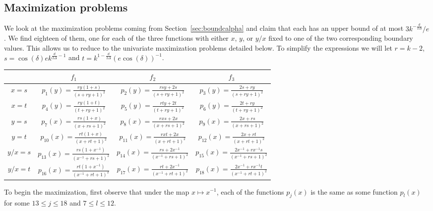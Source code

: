 \documentclass[10pt,a4paper]{article}
\theoremstyle{definition}
\begin{document}
\subsection{Maximization problems}
\label{app:zfr}
We look at the maximization problems coming from Section~\ref{sec:boundcalpha} and claim that each has an upper bound of at most $3 k^{-\frac{d}{2\Delta}}/e$.
We find eighteen of them, one for each of the three functions with either $x$, $y$, or $y/x$ fixed to one of the two corresponding boundary values.
This allows us to reduce to the univariate maximization problems detailed below.
To simplify the expressions we will let $r=k-2 $, $s = \cos(\delta)e k^{\frac{d}{2\Delta}-1}$ and $t=k^{1-\frac{d}{2\Delta}}(e\cos(\delta))^{-1}$.
%
\begin{center}
\begin{tabular}{ |c|c|c|c| }
\hline
& $f_1$ & $f_2$ & $f_3$ \\ \hline
  $x = s$ 
  & $p_1(y) =\frac{ry(1+s)}{(s+ry+1)^2}$
  & $p_2(y) = \frac{rsy+2s}{(s+ry+1)^2}$
  & $p_3(y) = \frac{2s+ry}{(s+ry+1)^2}$
  \\ \hline
  
  $x = t$ 
  & $p_4(y) = \frac{ry(1+t)}{(t+ry+1)^2}$ 
  & $p_5(y) = \frac{rty+2t}{(t+ry+1)^2}$
  & $p_6(y) = \frac{2t+ry}{(t+ry+1)^2}$
  \\ \hline
  
  $y = s$ 
  & $p_7(x) = \frac{rs(1+x)}{(x+rs+1)^2}$ 
  & $p_8(x) = \frac{rxs+2x}{(x+rs+1)^2}$
  & $p_9(x) = \frac{2x+rs}{(x+rs+1)^2}$
  \\ \hline
  
  $y = t$ 
  & $p_{10}(x) = \frac{rt(1+x)}{(x+rt+1)^2}$ 
  & $p_{11}(x) = \frac{rxt+2x}{(x+rt+1)^2}$
  & $p_{12}(x) = \frac{2x+rt}{(x+rt+1)^2}$
  \\ \hline
  
  $y/x = s$ 
  & $p_{13}(x) = \frac{rs(1+x^{-1})}{(x^{-1}+rs+1)^2}$ 
  & $p_{14}(x) = \frac{rs+2x^{-1}}{(x^{-1}+rs+1)^2}$ 
  & $p_{15}(x) = \frac{2x^{-1}+rx^{-1}s}{(x^{-1}+rs+1)^2}$ 
  \\ \hline
  
  $y/x = t$ 
  & $p_{16}(x) = \frac{rt(1+x^{-1})}{(x^{-1}+rt+1)^2}$ 
  & $p_{17}(x) = \frac{rt+2x^{-1}}{(x^{-1}+rt+1)^2}$ 
  & $p_{18}(x) = \frac{2x^{-1}+rx^{-1}t}{(x^{-1}+rt+1)^2}$  
  \\ \hline
\end{tabular}
\end{center}
%
To begin the maximization, first observe that under the map $x \mapsto x^{-1}$, each of the functions $p_j(x)$ is the same as some function $p_l(x)$ for some $13 \leq j \leq 18$ and $7 \leq l \leq 12$.
\end{document}
